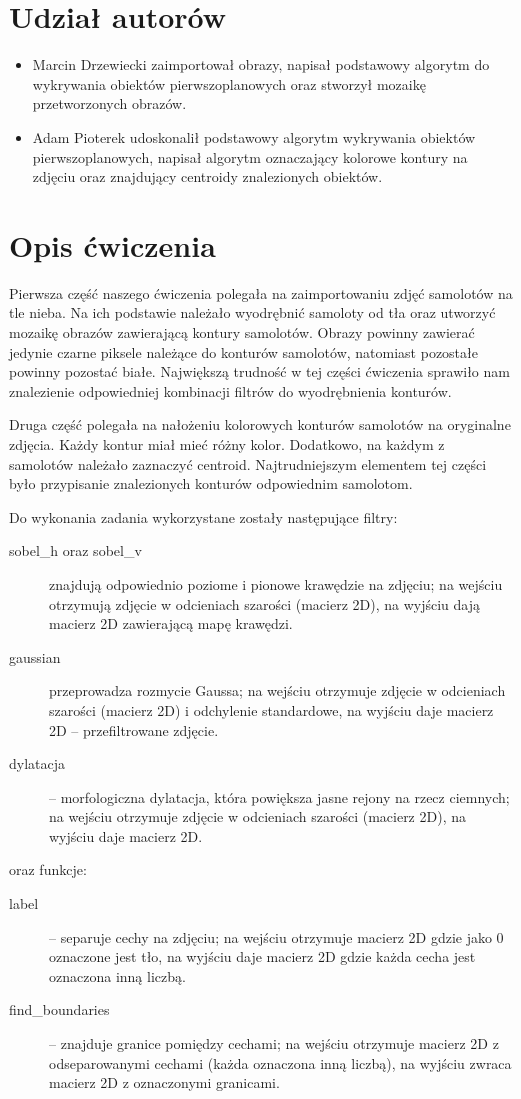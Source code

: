 \documentclass{article}
\begin{document}


\section*{Udział autorów}
\begin{itemize}
\item Marcin Drzewiecki zaimportował obrazy, napisał podstawowy algorytm do wykrywania obiektów pierwszoplanowych oraz stworzył mozaikę przetworzonych obrazów.
\item Adam Pioterek udoskonalił podstawowy algorytm wykrywania obiektów pierwszoplanowych, napisał algorytm oznaczający kolorowe kontury na zdjęciu oraz znajdujący centroidy znalezionych obiektów.
\end{itemize}

\section{Opis ćwiczenia}
Pierwsza część naszego ćwiczenia polegała na zaimportowaniu zdjęć samolotów na tle nieba.
Na ich podstawie należało wyodrębnić samoloty od tła oraz utworzyć mozaikę obrazów zawierającą kontury samolotów. 
Obrazy powinny zawierać jedynie czarne piksele należące do konturów samolotów, natomiast pozostałe powinny pozostać białe.
Największą trudność w tej części ćwiczenia sprawiło nam znalezienie odpowiedniej kombinacji filtrów do wyodrębnienia konturów.

Druga część polegała na nałożeniu kolorowych konturów samolotów na oryginalne zdjęcia.
Każdy kontur miał mieć różny kolor.
Dodatkowo, na każdym z samolotów należało zaznaczyć centroid.
Najtrudniejszym elementem tej części było przypisanie znalezionych konturów odpowiednim samolotom.

Do wykonania zadania wykorzystane zostały następujące filtry:
\begin{description}
\item[sobel_h oraz sobel_v] znajdują odpowiednio poziome i pionowe krawędzie na zdjęciu;
na wejściu otrzymują zdjęcie w odcieniach szarości (macierz 2D), na wyjściu dają macierz 2D zawierającą mapę krawędzi.
\item[gaussian] przeprowadza rozmycie Gaussa;
na wejściu otrzymuje zdjęcie w odcieniach szarości (macierz 2D) i odchylenie standardowe, na wyjściu daje macierz 2D – przefiltrowane zdjęcie.
\item[dylatacja] – morfologiczna dylatacja, która powiększa jasne rejony na rzecz ciemnych;
na wejściu otrzymuje zdjęcie w odcieniach szarości (macierz 2D), na wyjściu daje macierz 2D.
\end{description}
oraz funkcje:
\begin{description}
\item[label] – separuje cechy na zdjęciu;
na wejściu otrzymuje macierz 2D gdzie jako 0 oznaczone jest tło, na wyjściu daje macierz 2D gdzie każda cecha jest oznaczona inną liczbą.
\item[find_boundaries] – znajduje granice pomiędzy cechami;
na wejściu otrzymuje macierz 2D z odseparowanymi cechami (każda oznaczona inną liczbą), na wyjściu zwraca macierz 2D z oznaczonymi granicami.
\end{description}
 
\end{document}
